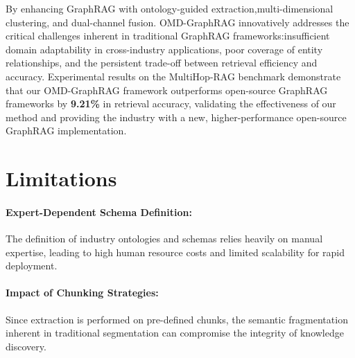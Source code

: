 \documentclass[11pt]{article}
\begin{document}
By enhancing GraphRAG with ontology-guided extraction,multi-dimensional clustering, and dual-channel fusion. OMD-GraphRAG innovatively addresses the critical challenges inherent in traditional GraphRAG frameworks:insufficient domain adaptability in cross-industry applications, poor coverage of entity relationships, and the persistent trade-off between retrieval efficiency and accuracy. Experimental results on the MultiHop-RAG benchmark demonstrate that our OMD-GraphRAG framework outperforms open-source GraphRAG frameworks by \textbf{9.21\%} in retrieval accuracy, validating the effectiveness of our method and providing the industry with a new, higher-performance open-source GraphRAG implementation.


\section{Limitations}
\paragraph{Expert-Dependent Schema Definition:} The definition of industry ontologies and schemas relies heavily on manual expertise, leading to high human resource costs and limited scalability for rapid deployment.


\paragraph{Impact of Chunking Strategies:} Since extraction is performed on pre-defined chunks, the semantic fragmentation inherent in traditional segmentation can compromise the integrity of knowledge discovery.
\end{document}

